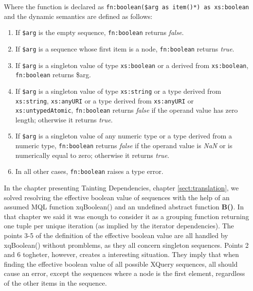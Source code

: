Where the function is declared as \texttt{fn:boolean(\$arg as item()*) as xs:boolean} and the dynamic semantics are
defined as follows\cite{w3cfuncOps}:

\begin{enumerate}
  \item If \texttt{\$arg} is the empty sequence, \texttt{fn:boolean} returns \textit{false}.
  \item If \texttt{\$arg} is a sequence whose first item is a node, \texttt{fn:boolean} returns \textit{true}.
  \item If \texttt{\$arg} is a singleton value of type \texttt{xs:boolean} or a derived from \texttt{xs:boolean},
  \texttt{fn:boolean} returns \$arg.
  \item If \texttt{\$arg} is a singleton value of type \texttt{xs:string} or a type derived from \texttt{xs:string},
  \texttt{xs:anyURI} or a type derived from \texttt{xs:anyURI} or \texttt{xs:untypedAtomic}, \texttt{fn:boolean}
  returns \textit{false} if the operand value has zero length; otherwise it returns \textit{true}.
  \item If \texttt{\$arg} is a singleton value of any numeric type or a type derived from a numeric type,
  \texttt{fn:boolean} returns \textit{false} if the operand value is \textit{NaN} or is numerically equal to zero;
  otherwise it returns \textit{true}.
  \item In all other cases, \texttt{fn:boolean} raises a type error.
\end{enumerate}

In the chapter presenting Tainting Dependencies, chapter \ref{sect:translation}, we solved resolving the effective
boolean value of sequences with the help of an assumed MQL function \textsf{xqBoolean()} and an undefined abstract
function \textbf{B()}. In that chapter we said it was enough to consider it as a grouping function returning one
tuple per unique iteration (as implied by the iterator dependencies). The points 3-5 of the definition of the
effective boolean value are all handled by \textsf{xqBoolean()} without promblems, as they all concern singleton
sequences. Points 2 and 6 togheter, however, creates a interesting situation. They imply that when finding the
effective boolean value of all possible XQuery sequences, all should cause an error, except the sequences where a
node is the first element, regardless of the other items in the sequence.

